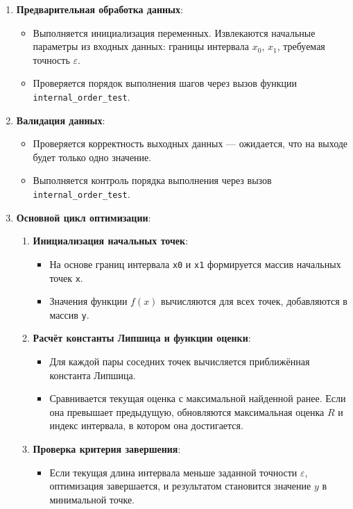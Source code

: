 \documentclass[a4paper,12pt]{article}
\begin{document}
\begin{enumerate}
    \item \textbf{Предварительная обработка данных}:
    \begin{itemize}
        \item Выполняется инициализация переменных. Извлекаются начальные параметры из входных данных: границы интервала $x_0$, $x_1$, требуемая точность $\varepsilon$.
        \item Проверяется порядок выполнения шагов через вызов функции \texttt{internal\_order\_test}.
    \end{itemize}

    \item \textbf{Валидация данных}:
    \begin{itemize}
        \item Проверяется корректность выходных данных — ожидается, что на выходе будет только одно значение.
        \item Выполняется контроль порядка выполнения через вызов \texttt{internal\_order\_test}.
    \end{itemize}

    \item \textbf{Основной цикл оптимизации}:
    \begin{enumerate}
        \item \textbf{Инициализация начальных точек}:
        \begin{itemize}
            \item На основе границ интервала \texttt{x0} и \texttt{x1} формируется массив начальных точек \texttt{x}.
            \item Значения функции $f(x)$ вычисляются для всех точек, добавляются в массив \texttt{y}.
        \end{itemize}

        \item \textbf{Расчёт константы Липшица и функции оценки}:
        \begin{itemize}
            \item Для каждой пары соседних точек вычисляется приближённая константа Липшица.
            \item Сравнивается текущая оценка с максимальной найденной ранее. Если она превышает предыдущую, обновляются максимальная оценка $R$ и индекс интервала, в котором она достигается.
        \end{itemize}

        \item \textbf{Проверка критерия завершения}:
        \begin{itemize}
            \item Если текущая длина интервала меньше заданной точности $\varepsilon$, оптимизация завершается, и результатом становится значение $y$ в минимальной точке.
        \end{itemize}


\end{enumerate}
\end{enumerate}
\end{document}
